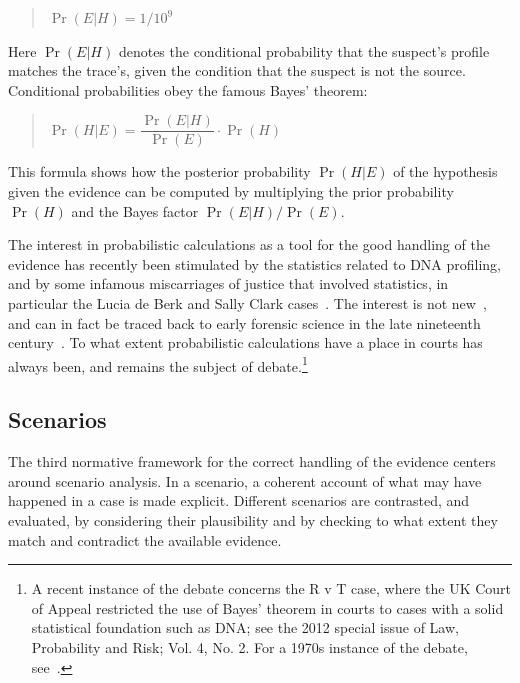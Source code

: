 \documentclass[10pt]{article}
\begin{document}
\begin{quotation}
	$\Pr(E|H) = 1/10^9$
\end{quotation}

\noindent Here $\Pr(E|H)$ denotes the conditional probability that the suspect's profile matches the trace's, given the condition that the suspect is not the source. Conditional probabilities obey the famous Bayes' theorem:

\begin{quotation}
	$\Pr(H|E) = \dfrac{\Pr(E|H)}{\Pr(E)}\cdot\Pr(H)$
\end{quotation}

\noindent This formula shows how the posterior probability $\Pr(H|E)$ of the hypothesis given the evidence can be computed by multiplying the prior probability $\Pr(H)$ and the Bayes factor $\Pr(E|H)/\Pr(E)$.


The interest in probabilistic calculations as a tool for the good handling of the evidence has recently been stimulated by the statistics related to DNA profiling, and by some infamous miscarriages of justice that involved statistics, in particular the Lucia de Berk and Sally Clark cases~\citep{dawidEtal2011,fenton2011,schnepsColmez2013}. The interest is not new~\citep{tillers2011}, and can in fact be traced back to early forensic science in the late nineteenth century~\citep{taroniEtal1998}. To what extent probabilistic calculations have a place in courts has always been, and remains the subject of debate.\footnote{A recent instance of the debate concerns the R v T case, where the UK Court of Appeal restricted the use of Bayes' theorem in courts to cases with a solid statistical foundation such as DNA; see the 2012 special issue of Law, Probability and Risk; Vol. 4, No. 2. For a 1970s instance of the debate, see~\citet{finkelsteinFairley1970,tribe1971}.}

\subsection{Scenarios}
\label{sec:introScen}
The third normative framework for the correct handling of the evidence centers around scenario analysis. In a scenario, a coherent account of what may have happened in a case is made explicit. Different scenarios are contrasted, and evaluated, by considering their plausibility and by checking to what extent they match and contradict the available evidence. 
\end{document}
